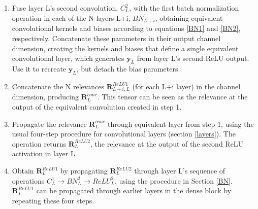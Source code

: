 \documentclass[fleqn,10pt]{wlscirep}
\begin{document}
{\begin{enumerate}

\item Fuse layer L's second convolution, $C^{2}_{L}$, with the first batch normalization operation in each of the N layers L+i, $BN^{1}_{L+i}$, obtaining equivalent convolutional kernels and biases according to equations \ref{BN1} and \ref{BN2}, respectively. Concatenate these parameters in their output channel dimension, creating the kernels and biases that define a single equivalent convolutional layer, which generates $\bm{y}_{L}$ from layer L's second ReLU output. Use it to recreate $\bm{y}_{L}$, but detach the bias parameters.

\item Concatenate the N relevances $\bm{R}_{L+i,L}^{ReLU1}$ (for each L+i layer) in the channel dimension, producing $\bm{R}_{L}^{conc}$. This tensor can be seen as the relevance at the output of the equivalent convolution created in step 1.

\item Propagate the relevance $\bm{R}_{L}^{conc}$ through equivalent layer from step 1, using the usual four-step procedure for convolutional layers (section \ref{layers}). The operation returns $\bm{R}_{L}^{ReLU2}$, the relevance at the output of the second ReLU activation in layer L.

\item Obtain $\bm{R}_{L}^{ReLU1}$ by propagating $\bm{R}_{L}^{ReLU2}$ through layer L's sequence of operations $C^{1}_{L} \rightarrow BN^{2}_{L} \rightarrow ReLU^{2}_{L}$, using the procedure in Section \ref{BN}. $\bm{R}_{L}^{ReLU1}$ can be propagated through earlier layers in the dense block by repeating these four steps.
\end{enumerate}

}
\end{document}
